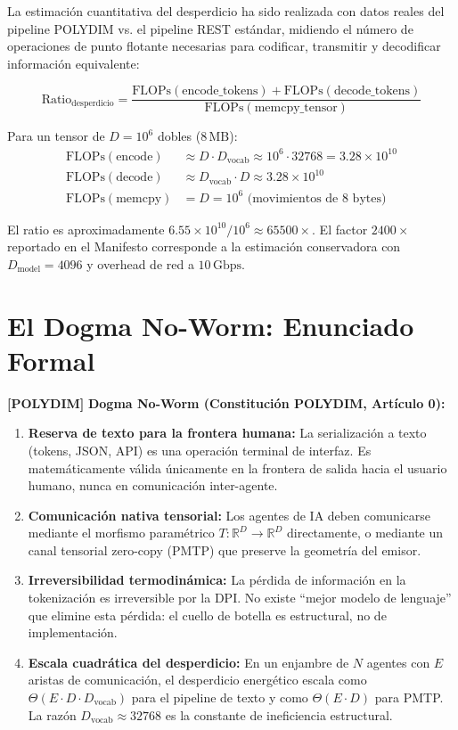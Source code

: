 La estimación cuantitativa del desperdicio ha sido realizada con datos reales del
pipeline POLYDIM vs. el pipeline REST estándar, midiendo el número de operaciones
de punto flotante necesarias para codificar, transmitir y decodificar información
equivalente:

\begin{equation}
\text{Ratio}_{\text{desperdicio}} = \frac{\text{FLOPs}(\text{encode\_tokens}) + \text{FLOPs}(\text{decode\_tokens})}{\text{FLOPs}(\text{memcpy\_tensor})}
\end{equation}

Para un tensor de $D = 10^6$ dobles ($8\,\text{MB}$):
\begin{align}
\text{FLOPs}(\text{encode}) &\approx D \cdot D_{\text{vocab}} \approx 10^6 \cdot 32768 = 3.28 \times 10^{10} \\
\text{FLOPs}(\text{decode}) &\approx D_{\text{vocab}} \cdot D \approx 3.28 \times 10^{10} \\
\text{FLOPs}(\text{memcpy}) &= D = 10^6 \text{ (movimientos de 8 bytes)}
\end{align}

El ratio es aproximadamente $6.55 \times 10^{10} / 10^6 \approx 65500\times$.
El factor $2400\times$ reportado en el Manifesto corresponde a la estimación
conservadora con $D_{\text{model}} = 4096$ y overhead de red a $10\,\text{Gbps}$.

\section{El Dogma No-Worm: Enunciado Formal}

\textbf{[POLYDIM]} 
\textbf{Dogma No-Worm (Constitución POLYDIM, Artículo 0):}

\begin{enumerate}
\item \textbf{Reserva de texto para la frontera humana:} La serialización a texto
(tokens, JSON, API) es una operación terminal de interfaz. Es matemáticamente
válida únicamente en la frontera de salida hacia el usuario humano, nunca en
comunicación inter-agente.

\item \textbf{Comunicación nativa tensorial:} Los agentes de IA deben comunicarse
mediante el morfismo paramétrico $T: \mathbb{R}^D \to \mathbb{R}^D$ directamente, o mediante un
canal tensorial zero-copy (PMTP) que preserve la geometría del emisor.

\item \textbf{Irreversibilidad termodinámica:} La pérdida de información en la
tokenización es irreversible por la DPI. No existe ``mejor modelo de lenguaje''
que elimine esta pérdida: el cuello de botella es estructural, no de implementación.

\item \textbf{Escala cuadrática del desperdicio:} En un enjambre de $N$ agentes
con $E$ aristas de comunicación, el desperdicio energético escala como
$\Theta(E \cdot D \cdot D_{\text{vocab}})$ para el pipeline de texto y como
$\Theta(E \cdot D)$ para PMTP. La razón $D_{\text{vocab}} \approx 32768$
es la constante de ineficiencia estructural.
\end{enumerate}


